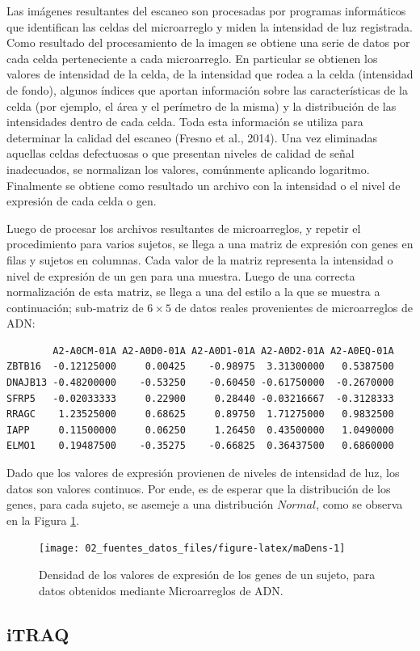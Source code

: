 \documentclass[12pt,twoside]{reedthesis}
\begin{document}
\par

Las imágenes resultantes del escaneo son procesadas por programas informáticos que identifican las celdas del microarreglo y miden la intensidad de luz registrada. Como resultado del procesamiento de la imagen se obtiene una serie de datos por cada celda perteneciente a cada microarreglo. En particular se obtienen los valores de intensidad de la celda, de la intensidad que rodea a la celda (intensidad de fondo), algunos índices que aportan información sobre las características de la celda (por ejemplo, el área y el perímetro de la misma) y la distribución de las intensidades dentro de cada celda. Toda esta información se utiliza para determinar la calidad del escaneo (Fresno et al., 2014). Una vez eliminadas aquellas celdas defectuosas o que presentan niveles de calidad de señal inadecuados, se normalizan los valores, comúnmente aplicando logaritmo. Finalmente se obtiene como resultado un archivo con la intensidad o el nivel de expresión de cada celda o gen.

\par

Luego de procesar los archivos resultantes de microarreglos, y repetir el procedimiento para varios sujetos, se llega a una matriz de expresión con genes en filas y sujetos en columnas. Cada valor de la matriz representa la intensidad o nivel de expresión de un gen para una muestra. Luego de una correcta normalización de esta matriz, se llega a una del estilo a la que se muestra a continuación; sub-matriz de \(6\times5\) de datos reales provenientes de microarreglos de ADN:

\newpage
\begin{verbatim}
        A2-A0CM-01A A2-A0D0-01A A2-A0D1-01A A2-A0D2-01A A2-A0EQ-01A
ZBTB16  -0.12125000     0.00425    -0.98975  3.31300000   0.5387500
DNAJB13 -0.48200000    -0.53250    -0.60450 -0.61750000  -0.2670000
SFRP5   -0.02033333     0.22900     0.28440 -0.03216667  -0.3128333
RRAGC    1.23525000     0.68625     0.89750  1.71275000   0.9832500
IAPP     0.11500000     0.06250     1.26450  0.43500000   1.0490000
ELMO1    0.19487500    -0.35275    -0.66825  0.36437500   0.6860000
\end{verbatim}
Dado que los valores de expresión provienen de niveles de intensidad de luz, los datos son valores continuos. Por ende, es de esperar que la distribución de los genes, para cada sujeto, se asemeje a una distribución \(Normal\), como se observa en la Figura \ref{fig:maDens}.
\begin{figure}

{\centering \texttt{[image: 02\_fuentes\_datos\_files/figure-latex/maDens-1]} 

}

\caption{Densidad de los valores de expresión de los genes de un sujeto, para datos obtenidos mediante Microarreglos de ADN.}\label{fig:maDens}
\end{figure}
\hypertarget{itraq}{%
\subsection{iTRAQ}\label{itraq}}
\end{document}
